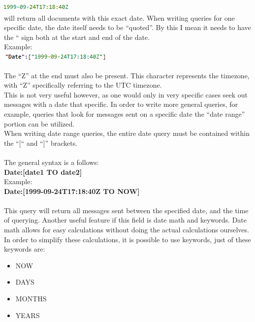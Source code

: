 \documentclass[a4paper,english]{report}
\begin{document}
\includegraphics{date2}\\

will return all documents with this exact date.
When writing queries for one specific date, the date itself needs to be “quoted”. By this I mean it needs to have the “ sign both at the start and end of the date. \\
Example: \\ 


\includegraphics{date1}


The “Z” at the end must also be present. This character represents the timezone, with “Z” specifically referring to the UTC timezone.\\

This is not very useful however, as one would only in very specific cases seek out messages with a date that specific. In order to write more general queries, for example, queries that look for messages sent on a specific date the “date range” portion can be utilized.\\
When writing date range queries, the entire date query must be contained within the “[“ and  “]” brackets.  \\\\
The general syntax is a follows: \\



\textbf{Date:[date1 TO date2]}\\

Example:\\


\textbf{Date:[1999-09-24T17:18:40Z TO NOW]}\\\\

This query will return all messages sent between the specified date, and the time of querying.
Another useful feature if this field is date math and keywords. Date math allows for easy calculations without doing the actual calculations ourselves. In order to simplify these calculations, it is possible to use keywords, just of these keywords are:

\begin{itemize}

\item NOW 
\item DAYS
\item MONTHS 
\item YEARS 

\end{itemize}
\end{document}
